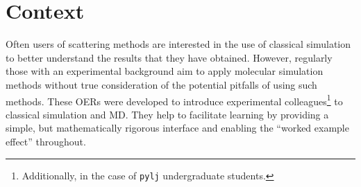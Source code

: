 \section*{Context}
Often users of scattering methods are interested in the use of classical simulation to better understand the results that they have obtained.
However, regularly those with an experimental background aim to apply molecular simulation methods without true consideration of the potential pitfalls of using such methods.
These OERs were developed to introduce experimental colleagues\footnote{Additionally, in the case of \texttt{pylj} undergraduate students.} to classical simulation and MD.
They help to facilitate learning by providing a simple, but mathematically rigorous interface and enabling the ``worked example effect'' throughout.
